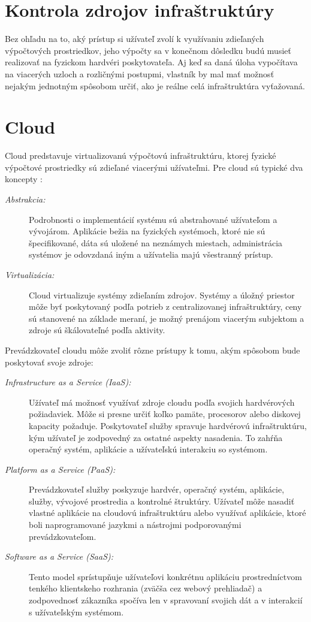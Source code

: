 \documentclass[printed,11pt,twoside,color,cover,table]{fithesis3}
\begin{document}
\section{Kontrola zdrojov infraštruktúry}
Bez ohľadu na to, aký prístup si užívateľ zvolí k využívaniu zdieľaných výpočtových prostriedkov, jeho výpočty sa v konečnom dôsledku budú musieť realizovať na fyzickom hardvéri poskytovateľa. 
Aj keď sa daná úloha vypočítava na viacerých uzloch a rozličnými postupmi, vlastník by mal mať možnosť nejakým jednotným spôsobom určiť, ako je reálne celá infraštruktúra vyťažovaná.

\section{Cloud}
Cloud predstavuje virtualizovanú výpočtovú infraštruktúru, ktorej fyzické výpočtové prostriedky sú zdieľané viacerými užívateľmi. 
Pre cloud sú typické dva koncepty \cite{cloud_bible}:
\begin{description}
\item[\emph{Abstrakcia:}] Podrobnosti o implementácií systému sú abstrahované užívateľom a vývojárom. Aplikácie bežia na fyzických systémoch,
ktoré nie sú špecifikované, dáta sú uložené na neznámych miestach, administrácia systémov je odovzdaná iným a užívatelia majú
všestranný prístup.
\item[\emph{Virtualizácia:}] Cloud virtualizuje systémy zdieľaním zdrojov. Systémy a úložný priestor môže byť poskytovaný podľa potrieb z 
centralizovanej infraštruktúry, ceny sú stanovené na základe meraní, je možný prenájom viacerým subjektom a zdroje sú škálovateľné podľa aktivity.
\end{description}
Prevádzkovateľ cloudu môže zvoliť rôzne prístupy k tomu, akým spôsobom bude poskytovať svoje zdroje\cite{cloud_bible}:
\begin{description}
\item[\emph{Infrastructure as a Service (IaaS):}] Užívateľ má možnosť využívať zdroje cloudu podľa svojich hardvérových požiadaviek.
Môže si presne určiť koľko pamäte, procesorov alebo diskovej kapacity požaduje. Poskytovateľ služby spravuje hardvérovú infraštruktúru,
kým užívateľ je zodpovedný za ostatné aspekty nasadenia. To zahŕňa operačný systém, aplikácie a užívateľskú interakciu so systémom. 
\item[\emph{Platform as a Service (PaaS):}] Prevádzkovateľ služby poskyzuje hardvér, operačný systém, aplikácie, služby, vývojové prostredia
a kontrolné štruktúry. Užívateľ môže nasadiť vlastné aplikácie na cloudovú infraštruktúru alebo využívať aplikácie, ktoré boli naprogramované
jazykmi a nástrojmi podporovanými prevádzkovateľom.
\item[\emph{Software as a Service (SaaS):}] Tento model sprístupňuje užívateľovi konkrétnu aplikáciu prostredníctvom tenkého klientskeho 
rozhrania (zväčša cez webový prehliadač) a zodpovednosť zákazníka spočíva len v spravovaní svojich dát a v interakcií s užívateľským systémom.
\end{description}
\end{document}
